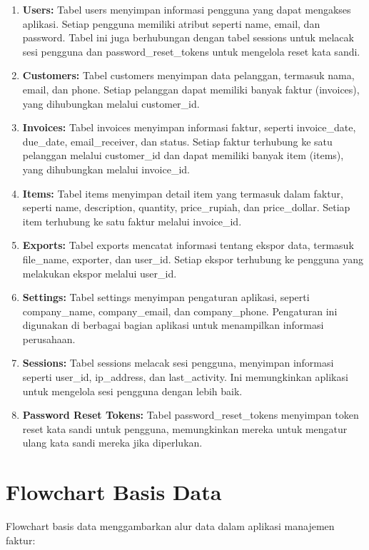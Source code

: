 \documentclass[a4paper]{report}
\begin{document}
\begin{enumerate}
\item \textbf{Users:} Tabel users menyimpan informasi pengguna yang dapat mengakses 
aplikasi. Setiap pengguna memiliki atribut seperti name, email, dan password. Tabel ini 
juga berhubungan dengan tabel sessions untuk melacak sesi pengguna dan 
password\_reset\_tokens untuk mengelola reset kata sandi.

\item \textbf{Customers:} Tabel customers menyimpan data pelanggan, termasuk nama, email, 
dan phone. Setiap pelanggan dapat memiliki banyak faktur (invoices), yang dihubungkan 
melalui customer\_id.

\item \textbf{Invoices:} Tabel invoices menyimpan informasi faktur, seperti invoice\_date, 
due\_date, email\_receiver, dan status. Setiap faktur terhubung ke satu pelanggan melalui 
customer\_id dan dapat memiliki banyak item (items), yang dihubungkan melalui invoice\_id.

\item \textbf{Items:} Tabel items menyimpan detail item yang termasuk dalam faktur, 
seperti name, description, quantity, price\_rupiah, dan price\_dollar. Setiap item 
terhubung ke satu faktur melalui invoice\_id.

\item \textbf{Exports:} Tabel exports mencatat informasi tentang ekspor data, termasuk 
file\_name, exporter, dan user\_id. Setiap ekspor terhubung ke pengguna yang melakukan 
ekspor melalui user\_id.

\item \textbf{Settings:} Tabel settings menyimpan pengaturan aplikasi, seperti 
company\_name, company\_email, dan company\_phone. Pengaturan ini digunakan di berbagai 
bagian aplikasi untuk menampilkan informasi perusahaan.

\item \textbf{Sessions:} Tabel sessions melacak sesi pengguna, menyimpan informasi seperti 
user\_id, ip\_address, dan last\_activity. Ini memungkinkan aplikasi untuk mengelola sesi 
pengguna dengan lebih baik.

\item \textbf{Password Reset Tokens:} Tabel password\_reset\_tokens menyimpan token reset 
kata sandi untuk pengguna, memungkinkan mereka untuk mengatur ulang kata sandi mereka jika 
diperlukan.
\end{enumerate}

\section{Flowchart Basis Data}
Flowchart basis data menggambarkan alur data dalam aplikasi manajemen faktur:
\end{document}
